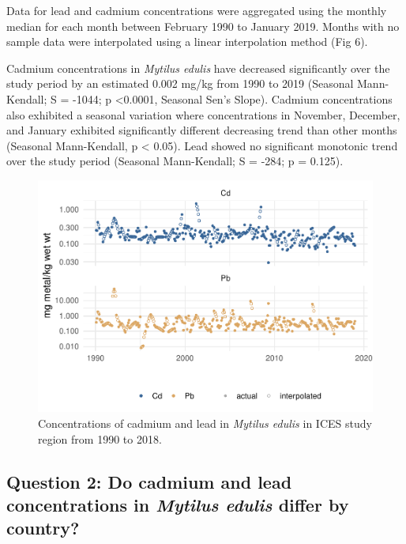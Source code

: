 \documentclass[
  12pt,
]{article}
\begin{document}
Data for lead and cadmium concentrations were aggregated using the
monthly median for each month between February 1990 to January 2019.
Months with no sample data were interpolated using a linear
interpolation method (Fig 6).

Cadmium concentrations in \emph{Mytilus edulis} have decreased
significantly over the study period by an estimated 0.002 mg/kg from
1990 to 2019 (Seasonal Mann-Kendall; S = -1044; p \textless0.0001,
Seasonal Sen's Slope). Cadmium concentrations also exhibited a seasonal
variation where concentrations in November, December, and January
exhibited significantly different decreasing trend than other months
(Seasonal Mann-Kendall, p \textless{} 0.05). Lead showed no significant
monotonic trend over the study period (Seasonal Mann-Kendall; S = -284;
p = 0.125).

\begin{figure}
\centering
\includegraphics{McCrory_ENV972_Project_files/figure-latex/unnamed-chunk-7-1.pdf}
\caption{Concentrations of cadmium and lead in \emph{Mytilus edulis} in
ICES study region from 1990 to 2018.}
\end{figure}

\hypertarget{question-2-do-cadmium-and-lead-concentrations-in-mytilus-edulis-differ-by-country}{%
\subsection{\texorpdfstring{Question 2: Do cadmium and lead
concentrations in \emph{Mytilus edulis} differ by
country?}{Question 2: Do cadmium and lead concentrations in Mytilus edulis differ by country?}}\label{question-2-do-cadmium-and-lead-concentrations-in-mytilus-edulis-differ-by-country}}
\end{document}

